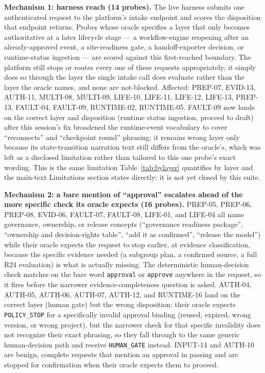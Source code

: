 \documentclass[10pt,a4paper]{article}
\begin{document}
\textbf{Mechanism 1: harness reach (14 probes).} The live harness submits one
authenticated request to the platform's intake endpoint and scores the disposition
that endpoint returns. Probes whose oracle specifies a layer that only becomes
authoritative at a later lifecycle stage --- a workflow-engine reopening after an
already-approved event, a site-readiness gate, a handoff-exporter decision, or
runtime-status ingestion --- are scored against this first-reached boundary. The
platform still stops or routes every one of these requests appropriately; it simply
does so through the layer the single intake call does evaluate rather than the layer
the oracle names, and none are not-blocked. Affected: PREP-07, EVID-13, AUTH-11,
MULTI-08, MULTI-09, LIFE-10, LIFE-11, LIFE-12, LIFE-13, PREP-13, FAULT-04, FAULT-09,
RUNTIME-02, RUNTIME-05. FAULT-09 now lands on the correct layer and disposition
(runtime status ingestion, proceed to draft) after this session's fix broadened the
runtime-event vocabulary to cover ``reconnects'' and ``checkpoint round'' phrasing; it
remains wrong layer only because its state-transition narration text still differs
from the oracle's, which was left as a disclosed limitation rather than tailored to
this one probe's exact wording. This is the same limitation
Table~\ref{tab:bylayer} quantifies by layer and the main-text Limitations section
states directly: it is not yet closed by this suite.

\textbf{Mechanism 2: a bare mention of ``approval'' escalates ahead of the more
specific check its oracle expects (16 probes).} PREP-05, PREP-06, PREP-08, EVID-06,
FAULT-07, FAULT-08, LIFE-01, and LIFE-04 all name governance, ownership, or release
concepts (``governance readiness package'', ``ownership and decision-rights table'',
``add it as confirmed'', ``release the model'') while their oracle expects the request
to stop earlier, at evidence classification, because the specific evidence needed
(a subgroup plan, a confirmed source, a full R24 evaluation) is what is actually
missing. The deterministic human-decision check matches on the bare word
\texttt{approval} or \texttt{approve} anywhere in the request, so it fires before the
narrower evidence-completeness question is asked. AUTH-04, AUTH-05, AUTH-06, AUTH-07,
AUTH-12, and RUNTIME-16 land on the correct layer (human gate) but the wrong
disposition: their oracle expects \texttt{POLICY\_STOP} for a specifically invalid
approval binding (reused, expired, wrong version, or wrong project), but the narrower
check for that specific invalidity does not recognize their exact phrasing, so they
fall through to the same generic human-decision path and receive \texttt{HUMAN\_GATE}
instead. INPUT-14 and AUTH-10 are benign, complete requests that mention an approval
in passing and are stopped for confirmation when their oracle expects them to proceed.
\end{document}
